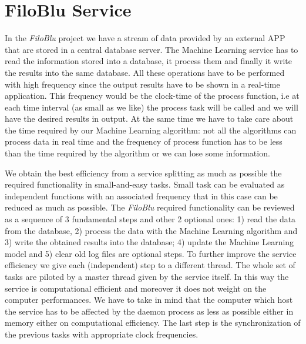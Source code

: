 \documentclass{standalone}
\begin{document}
\section*{FiloBlu Service}

In the \emph{FiloBlu} project we have a stream of data provided by an external APP that are stored in a central database server.
The Machine Learning service has to read the information stored into a database, it process them and finally it write the results into the same database.
All these operations have to be performed with high frequency since the output results have to be shown in a real-time application.
This frequency would be the clock-time of the process function, i.e at each time interval (as small as we like) the process task will be called and we will have the desired results in output.
At the same time we have to take care about the time required by our Machine Learning algorithm: not all the algorithms can process data in real time and the frequency of process function has to be less than the time required by the algorithm or we can lose some information.

We obtain the best efficiency from a service splitting as much as possible the required functionality in small-and-easy tasks.
Small task can be evaluated as independent functions with an associated frequency that in this case can be reduced as much as possible.
The \emph{FiloBlu} required functionality can be reviewed as a sequence of 3 fundamental steps and other 2 optional ones: 1) read the data from the database, 2) process the data with the Machine Learning algorithm and 3) write the obtained results into the database; 4) update the Machine Learning model and 5) clear old log files are optional steps.
To further improve the service efficiency we give each (independent) step to a different thread.
The whole set of tasks are piloted by a master thread given by the service itself.
In this way the service is computational efficient and moreover it does not weight on the computer performances.
We have to take in mind that the computer which host the service has to be affected by the daemon process as less as possible either in memory either on computational efficiency.
The last step is the synchronization of the previous tasks with appropriate clock frequencies.
\end{document}
